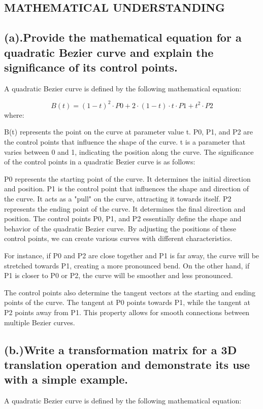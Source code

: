 \documentclass{article}
\begin{document}
\begin{itemize}
\section{MATHEMATICAL UNDERSTANDING}
\subsection{(a).Provide the mathematical equation for a quadratic Bezier curve and explain the significance of its control points.}
A quadratic Bezier curve is defined by the following mathematical equation:

\[ B(t) = (1 - t)^2 \cdot P0 + 2 \cdot (1 - t) \cdot t \cdot P1 + t^2 \cdot P2 \]
where:

B(t) represents the point on the curve at parameter value t.
P0, P1, and P2 are the control points that influence the shape of the curve.
t is a parameter that varies between 0 and 1, indicating the position along the curve.
The significance of the control points in a quadratic Bezier curve is as follows:

P0 represents the starting point of the curve. It determines the initial direction and position.
P1 is the control point that influences the shape and direction of the curve. It acts as a "pull" on the curve, attracting it towards itself.
P2 represents the ending point of the curve. It determines the final direction and position.
The control points P0, P1, and P2 essentially define the shape and behavior of the quadratic Bezier curve. By adjusting the positions of these control points, we can create various curves with different characteristics.

For instance, if P0 and P2 are close together and P1 is far away, the curve will be stretched towards P1, creating a more pronounced bend. On the other hand, if P1 is closer to P0 or P2, the curve will be smoother and less pronounced.

The control points also determine the tangent vectors at the starting and ending points of the curve. The tangent at P0 points towards P1, while the tangent at P2 points away from P1. This property allows for smooth connections between multiple Bezier curves.
\subsection{(b.)Write a transformation matrix for a 3D translation operation and demonstrate its use with a simple example.}
A quadratic Bezier curve is defined by the following mathematical equation:


\end{itemize}
\end{document}
